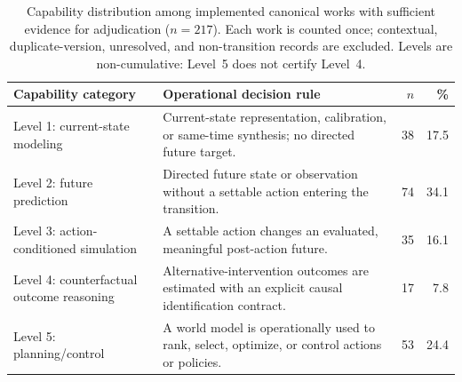 \begin{table}[t]
\caption{Capability distribution among implemented canonical works with sufficient evidence for adjudication ($n{=}217$). Each work is counted once; contextual, duplicate-version, unresolved, and non-transition records are excluded. Levels are non-cumulative: Level~5 does not certify Level~4.}
\label{tab:levels}
\centering
\small
\setlength{\tabcolsep}{4pt}
\renewcommand{\arraystretch}{1.08}
\begin{tabularx}{\linewidth}{@{}>{\raggedright\arraybackslash}p{2.55cm}Xrr@{}}
\toprule
\textbf{Capability category} & \textbf{Operational decision rule} & \textbf{$n$} & \textbf{\%} \\
\midrule
Level 1: current-state modeling & Current-state representation, calibration, or same-time synthesis; no directed future target. & 38 & 17.5 \\
Level 2: future prediction & Directed future state or observation without a settable action entering the transition. & 74 & 34.1 \\
Level 3: action-conditioned simulation & A settable action changes an evaluated, meaningful post-action future. & 35 & 16.1 \\
Level 4: counterfactual outcome reasoning & Alternative-intervention outcomes are estimated with an explicit causal identification contract. & 17 & 7.8 \\
Level 5: planning/control & A world model is operationally used to rank, select, optimize, or control actions or policies. & 53 & 24.4 \\
\bottomrule
\end{tabularx}
\end{table}

